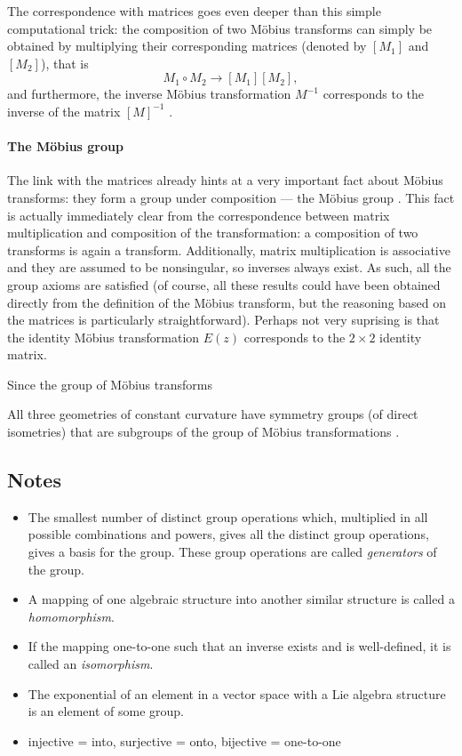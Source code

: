 The correspondence with matrices goes even deeper than this simple computational trick: the composition of two Möbius transforms  can simply be obtained by multiplying their corresponding matrices (denoted by \([M_1]\) and \([M_2]\)), that is
\[M_1 \circ M_2 \to [M_1][M_2],\]
and furthermore, the inverse Möbius transformation \(M^{-1}\) corresponds to the inverse of the matrix \([M]^{-1}\) \cite{Needham2021}.


\paragraph{The Möbius group} The link with the matrices already hints at a very important fact about Möbius transforms: they form a group under composition --- the Möbius group \moebiusgroup. This fact is actually immediately clear from the correspondence between matrix multiplication and composition of the transformation: a composition of two transforms is again a transform. Additionally, matrix multiplication is associative and they are assumed to be nonsingular, so inverses always exist. As such, all the group axioms are satisfied (of course, all these results could have been obtained directly from the definition of the Möbius transform, but the reasoning based on the matrices is particularly straightforward). Perhaps not very suprising is that the identity Möbius transformation \(E(z)\) corresponds to the \(2\times 2\) identity matrix.

Since the group of Möbius transforms 

All three geometries of constant curvature have symmetry groups (of direct isometries) that are subgroups of the group of Möbius transformations \cite{Needham2021}.

\subsection{Notes}
\begin{itemize}
    \item The smallest number of distinct group operations which, multiplied in all possible combinations and powers, gives all the distinct group operations, gives a basis for the group. These group operations are called \emph{generators} of the group.
    \item A mapping of one algebraic structure into another similar structure is called a \emph{homomorphism}.
    \item If the mapping one-to-one such that an inverse exists and is well-defined, it is called an \emph{isomorphism}.
    \item The exponential of an element in a vector space with a Lie algebra structure is an element of some group.
    \item injective = into, surjective = onto, bijective = one-to-one
\end{itemize}

